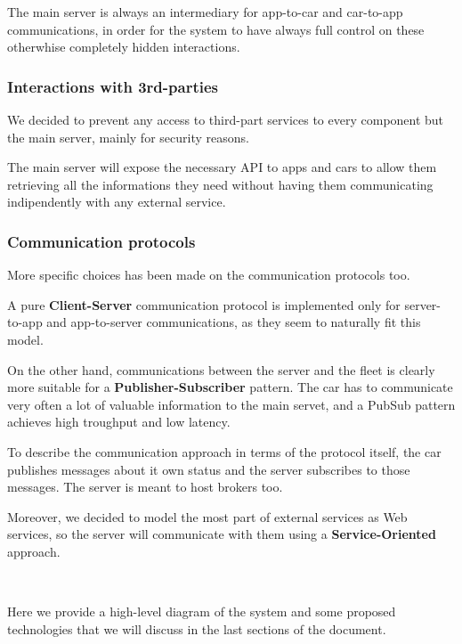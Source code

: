 \documentclass[11pt]{article} %
\begin{document}
\begin{description}
 The main server is always an intermediary for app-to-car and car-to-app communications, in order for the system to have always full control on these otherwhise completely hidden interactions.

\subsubsection{Interactions with 3rd-parties}
We decided to prevent any access to third-part services to every component but the main server, mainly for security reasons.

The main server will expose the necessary API to apps and cars to allow them retrieving all the informations they need without having them communicating indipendently with any external service.

\subsubsection{Communication protocols}
More specific choices has been made on the communication protocols too.

A pure \textbf{Client-Server} communication protocol is implemented only for server-to-app and app-to-server communications, as they seem to naturally fit this model.

On the other hand, communications between the server and the fleet is clearly more suitable for a \textbf{Publisher-Subscriber} pattern. The car has to communicate very often a lot of valuable information to the main servet, and a PubSub pattern achieves high troughput and low latency.
 
To describe the communication approach in terms of the protocol itself, the car publishes messages about it own status and the server subscribes to those messages. The server is meant to host brokers too.

Moreover, we decided to model the most part of external services as Web services, so the server will communicate with them using a \textbf{Service-Oriented} approach.

\hfill\

Here we provide a high-level diagram of the system and some proposed technologies that we will discuss in the last sections of  the document.



\end{description}
\end{document}
